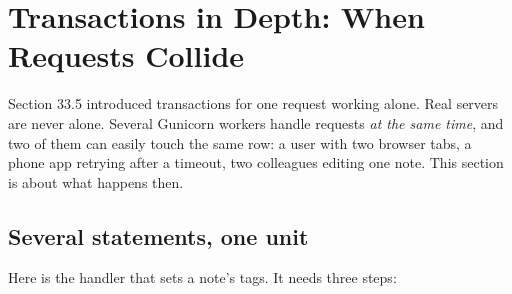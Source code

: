 \setcounter{section}{12}
\section{Transactions in Depth: When Requests Collide}\label{33-logic-execution:3313-transactions-in-depth-when-requests-collide}

Section 33.5 introduced transactions for one request working alone. Real servers are never alone. Several Gunicorn workers handle requests \emph{at the same time}, and two of them can easily touch the same row: a user with two browser tabs, a phone app retrying after a timeout, two colleagues editing one note. This section is about what happens then.

\subsection*{Several statements, one unit}\label{33-logic-execution:several-statements-one-unit}

Here is the handler that sets a note's tags. It needs three steps:

